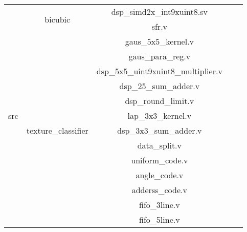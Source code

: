 \begin{table}[htb]
    \centering
    \begin{tabular}{|c|c|c|ll}
    \cline{1-3}
    \multirow{24}{*}{src} & \multirow{2}{*}{bicubic}              & dsp\_simd2x\_int9xuint8.sv          &  &  \\ \cline{3-3}
                          &                                       & sfr.v                               &  &  \\ \cline{2-3}
                          & \multirow{16}{*}{texture\_classifier} & gaus\_5x5\_kernel.v                 &  &  \\ \cline{3-3}
                          &                                       & gaus\_para\_reg.v                   &  &  \\ \cline{3-3}
                          &                                       & dsp\_5x5\_uint9xuint8\_multiplier.v &  &  \\ \cline{3-3}
                          &                                       & dsp\_25\_sum\_adder.v               &  &  \\ \cline{3-3}
                          &                                       & dsp\_round\_limit.v                 &  &  \\ \cline{3-3}
                          &                                       & lap\_3x3\_kernel.v                  &  &  \\ \cline{3-3}
                          &                                       & dsp\_3x3\_sum\_adder.v              &  &  \\ \cline{3-3}
                          &                                       & data\_split.v                       &  &  \\ \cline{3-3}
                          &                                       & uniform\_code.v                     &  &  \\ \cline{3-3}
                          &                                       & angle\_code.v                       &  &  \\ \cline{3-3}
                          &                                       & adderss\_code.v                     &  &  \\ \cline{3-3}
                          &                                       & fifo\_3line.v                       &  &  \\ \cline{3-3}
                          &                                       & fifo\_5line.v                       &  &  \\ \cline{3-3}

\end{tabular}
\end{table}
